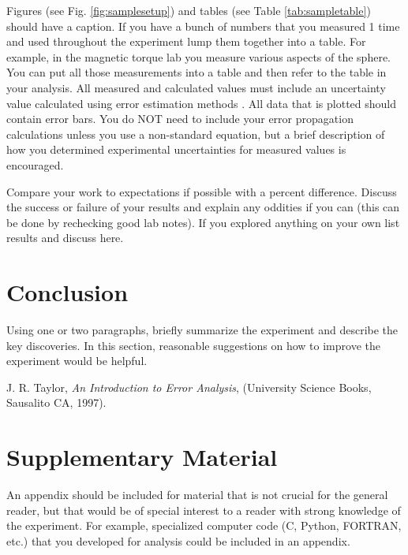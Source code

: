 \documentclass[twocolumn,secnumarabic,amssymb, nobibnotes, aps, pra]{revtex4}
\begin{document}
Figures (see Fig. \ref{fig:samplesetup}) and tables (see Table \ref{tab:sampletable}) should have a caption. If you have a bunch of numbers that you measured 1 time and used throughout the experiment lump them together into a table.  For example, in the magnetic torque lab you measure various aspects of the sphere.  You can put all those measurements into a table and then refer to the table in your analysis. All  measured and calculated values must include an uncertainty value calculated using error estimation methods \cite{taylor1997}. All data that is plotted should contain error bars. You do NOT need to include your error propagation calculations unless you use a non-standard equation, but a brief description of how you determined experimental uncertainties for measured values is encouraged.

Compare your work to expectations if possible with a percent difference.  Discuss the success or failure of your results and explain any oddities if you can (this can be done by rechecking good lab notes).  If you explored anything on your own list results and discuss here.  



\section{Conclusion}

Using one or two paragraphs, briefly summarize the experiment and describe the key discoveries.  In this section, reasonable suggestions on how to improve the experiment would be helpful.

\begin{thebibliography}{5}
 J. R. Taylor, \textit{An Introduction to Error Analysis}, (University Science Books, Sausalito CA, 1997).
\end{thebibliography}


\appendix
\section{Supplementary Material}

An appendix should be included for material that is not crucial for the general reader, but that would be of special interest to a reader with strong knowledge of the experiment.  For example, specialized computer code (C, Python, FORTRAN, etc.) that you developed for analysis could be included in an appendix.
\end{document}
